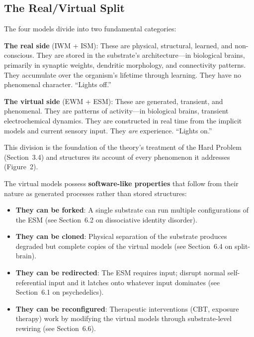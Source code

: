 \documentclass[12pt]{article}
\begin{document}
\subsection{The Real/Virtual Split}

The four models divide into two fundamental categories:

\textbf{The real side} (IWM + ISM): These are physical, structural, learned, and non-conscious. They are stored in the substrate's architecture---\hspace{0pt}in biological brains, primarily in synaptic weights, dendritic morphology, and connectivity patterns. They accumulate over the organism's lifetime through learning. They have no phenomenal character. ``Lights off.''

\textbf{The virtual side} (EWM + ESM): These are generated, transient, and phenomenal. They are patterns of activity---\hspace{0pt}in biological brains, transient electrochemical dynamics. They are constructed in real time from the implicit models and current sensory input. They \emph{are} experience. ``Lights on.''

This division is the foundation of the theory's treatment of the Hard Problem (Section~3.4) and structures its account of every phenomenon it addresses (Figure~2).

The virtual models possess \textbf{software-like properties} that follow from their nature as generated processes rather than stored structures:

\begin{itemize}
\item \textbf{They can be forked}: A single substrate can run multiple configurations of the ESM (see Section~6.2 on dissociative identity disorder).
\item \textbf{They can be cloned}: Physical separation of the substrate produces degraded but complete copies of the virtual models (see Section~6.4 on split-brain).
\item \textbf{They can be redirected}: The ESM requires input; disrupt normal self-referential input and it latches onto whatever input dominates (see Section~6.1 on psychedelics).
\item \textbf{They can be reconfigured}: Therapeutic interventions (CBT, exposure therapy) work by modifying the virtual models through substrate-level rewiring (see Section~6.6).
\end{itemize}
\end{document}
